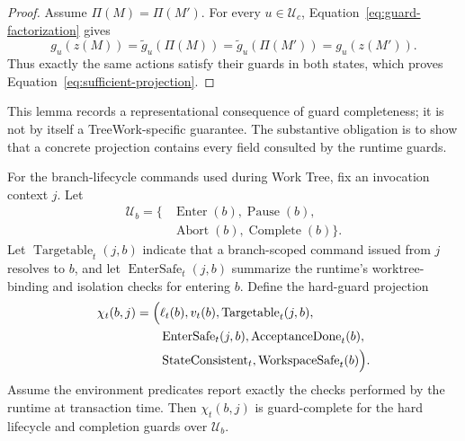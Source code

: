 \begin{proof}
Assume $\Pi(M)=\Pi(M')$.  For every $u\in\mathcal U_c$,
Equation~\eqref{eq:guard-factorization} gives
\begin{equation}
g_u(z(M))
=
\widetilde g_u(\Pi(M))
=
\widetilde g_u(\Pi(M'))
=
g_u(z(M')).
\end{equation}
Thus exactly the same actions satisfy their guards in both states, which proves
Equation~\eqref{eq:sufficient-projection}.
\end{proof}

This lemma records a representational consequence of guard completeness; it is
not by itself a TreeWork-specific guarantee.  The substantive obligation is to
show that a concrete projection contains every field consulted by the runtime
guards.

\begin{proposition}
\label{prop:treework-guard-complete}
For the branch-lifecycle commands used during Work Tree, fix an invocation
context $j$.  Let
\begin{equation}
\begin{aligned}
\mathcal U_b=\{&\operatorname{Enter}(b),\operatorname{Pause}(b),\\
                &\operatorname{Abort}(b),\operatorname{Complete}(b)\}.
\end{aligned}
\end{equation}
Let $\operatorname{Targetable}_t(j,b)$ indicate that a branch-scoped command
issued from $j$ resolves to $b$, and let
$\operatorname{EnterSafe}_t(j,b)$ summarize the runtime's worktree-binding and
isolation checks for entering $b$.  Define the hard-guard projection
\begin{equation}
\begin{aligned}
\chi_t(b,j)
=
\Bigl(&\ell_t(b),v_t(b),
  \operatorname{Targetable}_t(j,b),\\
  &\operatorname{EnterSafe}_t(j,b),
  \operatorname{AcceptanceDone}_t(b),\\
  &\operatorname{StateConsistent}_t,
  \operatorname{WorkspaceSafe}_t(b)\Bigr).
\end{aligned}
\label{eq:coordination-projection}
\end{equation}
Assume the environment predicates report exactly the checks performed by the
runtime at transaction time.  Then $\chi_t(b,j)$ is guard-complete for the
hard lifecycle and completion guards over $\mathcal U_b$.
\end{proposition}

